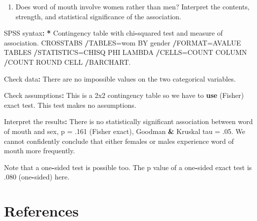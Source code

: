 \documentclass[a4paper]{book}
\newenvironment{Shaded}{\begin{snugshade}}{\end{snugshade}}
\newcommand{\KeywordTok}[1]{\textcolor[rgb]{0,0,0}{\textbf{#1}}}
\newcommand{\DecValTok}[1]{\textcolor[rgb]{0.00,0.00,0.00}{#1}}
\newcommand{\StringTok}[1]{\textcolor[rgb]{0.00,0.00,0.00}{#1}}
\newcommand{\OperatorTok}[1]{\textcolor[rgb]{0.00,0.00,0.00}{\textbf{#1}}}
\newcommand{\ErrorTok}[1]{\textcolor[rgb]{0.00,0.00,0.00}{\textbf{#1}}}
\newcommand{\NormalTok}[1]{#1}
\providecommand{\tightlist}{%
  \setlength{\itemsep}{0pt}\setlength{\parskip}{0pt}}
\theoremstyle{definition}
\theoremstyle{definition}
\theoremstyle{definition}
\theoremstyle{remark}
\begin{document}
\begin{enumerate}
\def\labelenumi{\arabic{enumi}.}
\setcounter{enumi}{2}
\tightlist
\item
  Does word of mouth involve women rather than men? Interpret the
  contents, strength, and statistical significance of the association.
\end{enumerate}

\begin{Shaded}
\begin{Highlighting}[]
\NormalTok{SPSS syntax}\OperatorTok{:}\StringTok{  }
\StringTok{  }
\ErrorTok{*}\StringTok{ }\NormalTok{Contingency table with chi}\OperatorTok{-}\NormalTok{squared test and measure of association.  }
\NormalTok{CROSSTABS  }
  \OperatorTok{/}\NormalTok{TABLES=wom BY gender  }
  \OperatorTok{/}\NormalTok{FORMAT=AVALUE TABLES  }
  \OperatorTok{/}\NormalTok{STATISTICS=CHISQ PHI LAMBDA   }
  \OperatorTok{/}\NormalTok{CELLS=COUNT COLUMN   }
  \OperatorTok{/}\NormalTok{COUNT ROUND CELL  }
  \OperatorTok{/}\NormalTok{BARCHART.  }
  
\NormalTok{Check data}\OperatorTok{:}\StringTok{  }
\StringTok{  }
\NormalTok{There are no impossible values on the two categorical   }
\NormalTok{variables.  }
  
\NormalTok{Check assumptions}\OperatorTok{:}\StringTok{  }
\StringTok{  }
\NormalTok{This is a 2x2 contingency table so we have to }\KeywordTok{use}\NormalTok{ (Fisher)  }
\NormalTok{exact test. This test makes no assumptions.  }
  
\NormalTok{Interpret the results}\OperatorTok{:}\StringTok{  }
\StringTok{  }
\NormalTok{There is no statistically significant association between  }
\NormalTok{word of mouth and sex, p =}\StringTok{ }\NormalTok{.}\DecValTok{161}\NormalTok{ (Fisher exact), Goodman }\OperatorTok{&}\StringTok{  }
\NormalTok{Kruskal tau =}\StringTok{ }\NormalTok{.}\DecValTok{05}\NormalTok{. We cannot confidently conclude that  }
\NormalTok{either females or males experience word of mouth more  }
\NormalTok{frequently.  }
  
\NormalTok{Note that a one}\OperatorTok{-}\NormalTok{sided test is possible too. The p value  }
\NormalTok{of a one}\OperatorTok{-}\NormalTok{sided exact test is .}\DecValTok{080}\NormalTok{ (one}\OperatorTok{-}\NormalTok{sided) here.  }
\end{Highlighting}
\end{Shaded}

\chapter*{References}\label{references}
\end{document}
